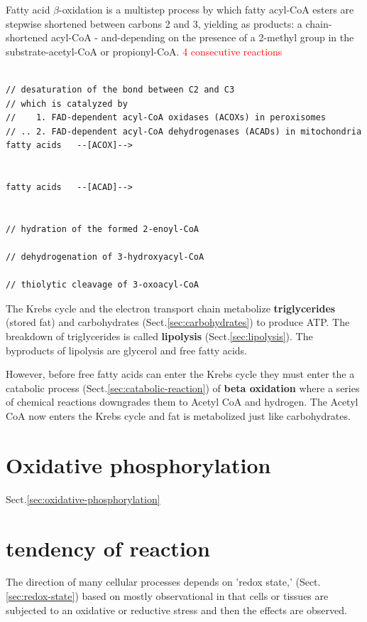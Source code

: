 Fatty acid $\beta$-oxidation is a multistep process by which fatty acyl-CoA
esters are stepwise shortened between carbons 2 and 3, yielding as products: a
chain-shortened acyl-CoA - and-depending on the presence of a 2-methyl group in
the substrate-acetyl-CoA or propionyl-CoA. \textcolor{red}{4 consecutive
reactions}
\begin{verbatim}

// desaturation of the bond between C2 and C3
// which is catalyzed by
//    1. FAD-dependent acyl-CoA oxidases (ACOXs) in peroxisomes
// .. 2. FAD-dependent acyl-CoA dehydrogenases (ACADs) in mitochondria
fatty acids   --[ACOX]-->


fatty acids   --[ACAD]-->


// hydration of the formed 2-enoyl-CoA

// dehydrogenation of 3-hydroxyacyl-CoA

// thiolytic cleavage of 3-oxoacyl-CoA

\end{verbatim}

The Krebs cycle and the electron transport chain metabolize {\bf triglycerides}
(stored fat) and carbohydrates (Sect.\ref{sec:carbohydrates}) to produce ATP.
The breakdown of triglycerides is called {\bf lipolysis}
(Sect.\ref{sec:lipolysis}). The byproducts of lipolysis are glycerol and free
fatty acids.

However, before free fatty acids can enter the Krebs cycle they must enter the a
catabolic process (Sect.\ref{sec:catabolic-reaction}) of {\bf beta oxidation}
where a series of chemical reactions downgrades them to Acetyl CoA and hydrogen.
The Acetyl CoA now enters the Krebs cycle and fat is metabolized just like
carbohydrates.




\section{Oxidative phosphorylation}

Sect.\ref{sec:oxidative-phosphorylation}

\section{tendency of reaction}


The direction of many cellular processes depends on 'redox state,'
(Sect.\ref{sec:redox-state}) based on mostly observational in that cells or
tissues are subjected to an oxidative or reductive stress and then the effects
are observed.


